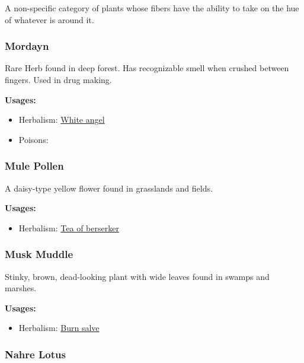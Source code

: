 A non-specific category of plants whose fibers have the ability to take on the hue of whatever is around it.

\subsubsection{Mordayn}
\label{Mordayn}

Rare Herb found in deep forest. Has recognizable smell when crushed between fingers. Used in drug making.

\vspace{5mm}

\textbf{Usages:}

\begin{itemize}[noitemsep]
\item[] Herbalism: \hyperref[White angel]{White angel}
\item[] Poisons: \poison
\end{itemize}

\subsubsection{Mule Pollen}
\label{Mule Pollen}

A daisy-type yellow flower found in grasslands and fields.

\vspace{5mm}

\textbf{Usages:}

\begin{itemize}[noitemsep]
\item[] Herbalism: \hyperref[Tea of berserker]{Tea of berserker}
\end{itemize}

\subsubsection{Musk Muddle}
\label{Musk Muddle}

Stinky, brown, dead-looking plant with wide leaves found in swamps and marshes.

\vspace{5mm}

\textbf{Usages:}

\begin{itemize}[noitemsep]
\item[] Herbalism: \hyperref[Burn salve]{Burn salve}
\end{itemize}

\subsubsection{Nahre Lotus}
\label{Nahre Lotus}

